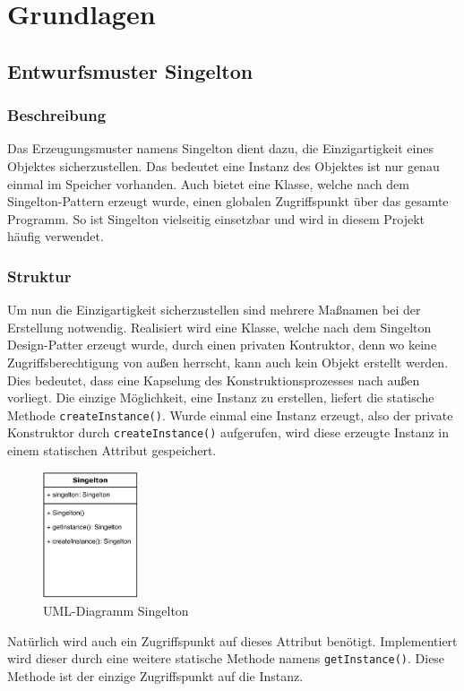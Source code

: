 \section{Grundlagen}\label{sec:grundlagen}
\subsection{Entwurfsmuster Singelton}\label{subsec:entwurdsmuster-singelton}
\subsubsection{Beschreibung}
Das Erzeugungsmuster namens Singelton dient dazu, die Einzigartigkeit eines Objektes sicherzustellen.
Das bedeutet eine Instanz des Objektes ist nur genau einmal im Speicher vorhanden.
Auch bietet eine Klasse, welche nach dem Singelton-Pattern erzeugt wurde, einen globalen Zugriffspunkt über das gesamte Programm.
So ist Singelton vielseitig einsetzbar und wird in diesem Projekt häufig verwendet.
\subsubsection{Struktur}
Um nun die Einzigartigkeit sicherzustellen sind mehrere Maßnamen bei der Erstellung notwendig.
Realisiert wird eine Klasse, welche nach dem Singelton Design-Patter erzeugt wurde, durch einen privaten Kontruktor, denn wo keine Zugriffsberechtigung von außen herrscht, kann auch kein Objekt erstellt werden.
Dies bedeutet, dass eine Kapselung des Konstruktionsprozesses nach außen vorliegt.
Die einzige Möglichkeit, eine Instanz zu erstellen, liefert die statische Methode \lstinline{createInstance()}.
Wurde einmal eine Instanz erzeugt, also der private Konstruktor durch \lstinline{createInstance()} aufgerufen, wird diese erzeugte Instanz in einem statischen Attribut gespeichert.\\
\begin{figure}[H]
    \centering
    \includegraphics[width=0.25\textwidth]{fig/ainf/Singelton.pdf}
    \caption{UML-Diagramm Singelton}
\end{figure}
Natürlich wird auch ein Zugriffspunkt auf dieses Attribut benötigt.
Implementiert wird dieser durch eine weitere statische Methode namens \lstinline{getInstance()}.
Diese Methode ist der einzige Zugriffspunkt auf die Instanz.
